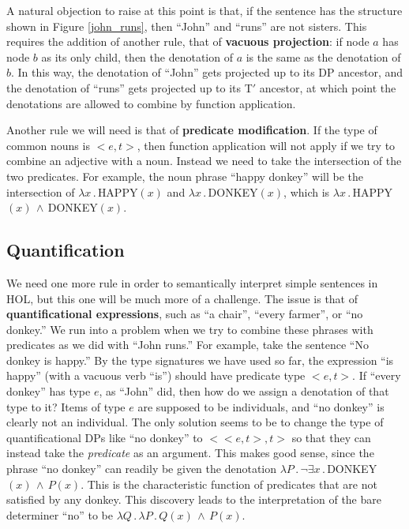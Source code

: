 \documentclass[11pt, oneside]{article}      %
\begin{document}
A natural objection to raise at this point is that, if the sentence has the structure shown in Figure \ref{john_runs}, then ``John'' and ``runs'' are not sisters.  This requires the addition of another rule, that of \textbf{vacuous projection}: if node $a$ has node $b$ as its only child, then the denotation of $a$ is the same as the denotation of $b$.  In this way, the denotation of ``John'' gets projected up to its DP ancestor, and the denotation of ``runs'' gets projected up to its T$'$ ancestor, at which point the denotations are allowed to combine by function application.

Another rule we will need is that of \textbf{predicate modification}.  If the type of common nouns is ${<}e, t{>}$, then function application will not apply if we try to combine an adjective with a noun.  Instead we need to take the intersection of the two predicates.  For example, the noun phrase ``happy donkey'' will be the intersection of $\lambda x \, . \, $HAPPY$(x)$ and $\lambda x \, . \, $DONKEY$(x)$, which is $\lambda x \, . \, $HAPPY$(x) \, \wedge \, $DONKEY$(x)$.

\subsection{Quantification} \label{quantification}

We need one more rule in order to semantically interpret simple sentences in HOL, but this one will be much more of a challenge.  The issue is that of \textbf{quantificational expressions}, such as ``a chair'', ``every farmer'', or ``no donkey.''  We run into a problem when we try to combine these phrases with predicates as we did with ``John runs.''  For example, take the sentence ``No donkey is happy.'' By the type signatures we have used so far, the expression ``is happy'' (with a vacuous verb ``is'') should have predicate type ${<}e, t{>}$.  If ``every donkey'' has type $e$, as ``John'' did, then how do we assign a denotation of that type to it?  Items of type $e$ are supposed to be individuals, and ``no donkey'' is clearly not an individual.  The only solution seems to be to change the type of quantificational DPs like ``no donkey'' to ${<}{<}e, t{>}, t{>}$ so that they can instead take the \textit{predicate} as an argument.  This makes good sense, since the phrase ``no donkey'' can readily be given the denotation $\lambda P \, . \, \neg \exists x \, . \, $DONKEY$(x) \, \wedge \, P(x)$.  This is the characteristic function of predicates that are not satisfied by any donkey.  This discovery leads to the interpretation of the bare determiner ``no'' to be $\lambda Q \, . \, \lambda P \, . \, Q(x) \, \wedge \, P(x)$.  
\end{document}
